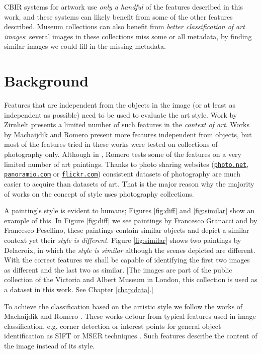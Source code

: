 \documentclass[11pt,a4paper,twoside,openright]{report}
\begin{document}
CBIR systems for artwork \cite{cfsp12air,isv12mpeg,ymvz03tree} use \emph{only a
handful} of the features described in this work, and these systems can likely
benefit from some of the other features described.  Museum collections can also
benefit from \emph{better classification of art images}:  several images in
these collections miss some or all metadata, by finding similar images we could
fill in the missing metadata.

\section{Background}

Features that are independent from the objects in the image (or at least as
independent as possible) need to be used to evaluate the art style.  Work by
Zirnhelt \cite{zirnhelt07art} presents a limited number of such features in the
\emph{context of art}.  Works by Machaijdik \cite{mach10clas} and Romero
\cite{rmc12ajs} present more features independent from objects, but most of the
features tried in these works were tested on collections of photography only.
Although in \cite{rmc12ajs}, Romero tests some of the features on a very
limited number of art paintings.  Thanks to photo sharing websites
(\href{http://photo.net}{\texttt{photo.net}},
\href{http://panoramio.com}{\texttt{panoramio.com}} or
\href{http://flickr.com}{\texttt{flickr.com}}) consistent datasets of
photography are much easier to acquire than datasets of art.  That is the major
reason why the majority of works on the concept of style uses photography
collections.

A painting's style is evident to humans; Figures \ref{fig:diff} and
\ref{fig:similar} show an example of this.  In Figure \ref{fig:diff} we see
paintings by Francesco Granacci and by Francesco Pesellino, these paintings
contain similar objects and depict a similar context yet their \emph{style is
different}.  Figure \ref{fig:similar} shows two paintings by Delacroix, in
which the \emph{style is similar} although the scenes depicted are different.
With the correct features we shall be capable of identifying the first two
images as different and the last two as similar.  [The images are part of the
public collection of the Victoria and Albert Museum in London, this collection
is used as a dataset in this work.  See Chapter \ref{chap:data}.]

To achieve the classification based on the artistic style we follow the works
of Machaijdik \cite{mach10clas} and Romero \cite{rmc12ajs}.  These works detour
from typical features used in image classification, e.g.  corner detection or
interest points for general object identification as SIFT or MSER techniques
\cite{szel11book}.  Such features describe the content of the image instead of
its style.
\end{document}
